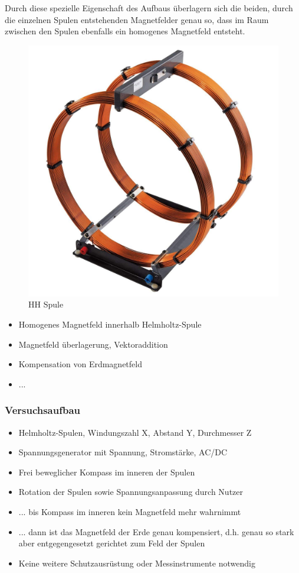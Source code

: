 Durch diese spezielle Eigenschaft des Aufbaus überlagern sich die beiden, durch die einzelnen Spulen entstehenden Magnetfelder genau so, dass im Raum zwischen den Spulen ebenfalls ein homogenes Magnetfeld entsteht.
	
\begin{figure}[h!]
	\centering
	\includegraphics[width=1\textwidth]{images/Helmholtz.jpg}
	\caption{HH Spule}
	\label{img:Helmholtz}
\end{figure}

\begin{itemize}
	\item Homogenes Magnetfeld innerhalb Helmholtz-Spule
	\item Magnetfeld überlagerung, Vektoraddition
	\item Kompensation von Erdmagnetfeld
	\item ...
\end{itemize}

\subsubsection{Versuchsaufbau}
\begin{itemize}
	\item Helmholtz-Spulen, Windungszahl X, Abstand Y, Durchmesser Z
	\item Spannungsgenerator mit Spannung, Stromstärke, AC/DC
	\item Frei beweglicher Kompass im inneren der Spulen
	\item Rotation der Spulen sowie Spannungsanpassung durch Nutzer
	\item ... bis Kompass im inneren kein Magnetfeld mehr wahrnimmt
	\item ... dann ist das Magnetfeld der Erde genau kompensiert, d.h. genau so stark aber entgegengesetzt gerichtet zum Feld der Spulen
	\item Keine weitere Schutzausrüstung oder Messinstrumente notwendig
\end{itemize}